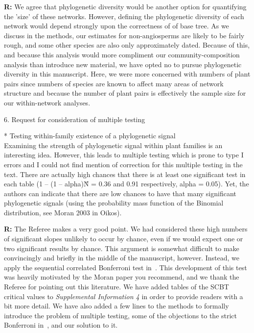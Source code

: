 \documentclass[12pt]{letter}
\newenvironment{refquote}{\bigskip \begin{it}}{\end{it}\smallskip}
\begin{document}
		\textbf{R:} We agree that phylogenetic diversity would be another option for quantifying the 'size' of these networks. However, defining the phylogenetic diversity of each network would depend strongly upon the correctness of of base tree. As we discuss in the methods, our estimates for non-angiosperms are likely to be fairly rough, and some other species are also only approximately dated. Because of this, and because this analysis would more compliment our community-composition analysis than introduce new material, we have opted no to pursue phylogenetic diversity in this manuscript. Here, we were more concerned with numbers of plant pairs since numbers of species are known to affect many areas of network structure and because the number of plant pairs is effectively the sample size for our within-network analyses. 


	6. Request for consideration of multiple testing

		\begin{refquote}
			* Testing within-family existence of a phylogenetic signal\\
			Examining the strength of phylogenetic signal within plant families is an interesting idea. However, this leads to multiple testing which is prone to type I errors and I could not find mention of correction for this multiple testing in the text. There are actually high chances that there is at least one significant test in each table (1 – (1 – alpha)\^N = 0.36 and 0.91 respectively, alpha = 0.05). Yet, the authors can indicate that there are low chances to have that many significant phylogenetic signals (using the probability mass function of the Binomial distribution, see Moran 2003 in Oikos).
		\end{refquote}


		\textbf{R:} The Referee makes a very good point. We had considered these high numbers of significant slopes unlikely to occur by chance, even if we would expect one or two significant results by chance. This argument is somewhat difficult to make convincingly and briefly in the middle of the manuscript, however. Instead, we apply the sequential correlated Bonferroni test in~\citet{Drezner2016}. This development of this test was heavily motivated by the Moran paper you recommend, and we thank the Referee for pointing out this literature. We have added tables of the SCBT critical values to \emph{Supplemental Information 4} in order to provide readers with a bit more detail. We have also added a few lines to the methods to formally introduce the problem of multiple testing, some of the objections to the strict Bonferroni in~\citet{Moran2003}, and our solution to it.
\end{document}
